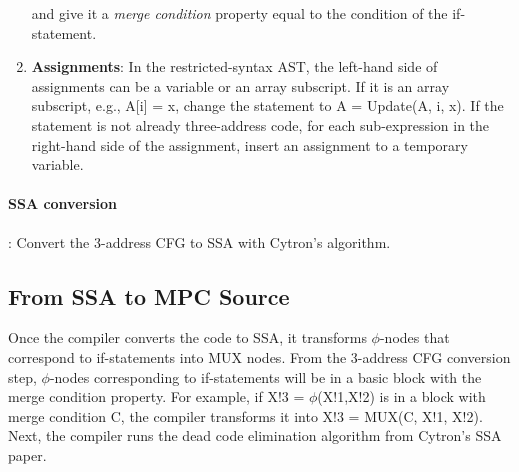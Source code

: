 \begin{enumerate}
                and give it a \emph{merge condition} property equal to the condition of the if-statement.
          \item
                \textbf{Assignments}:
                In the restricted-syntax AST,
                the left-hand side of assignments
                can be a variable or an array subscript.
                If it is an array subscript, e.g., {\sf A[i] = x},
                change the statement to {\sf A = Update(A, i, x)}.
                If the statement is not already three-address code,
                for each sub-expression in the right-hand side of the assignment,
                insert an assignment to a temporary variable.
        \end{enumerate}
        \paragraph{SSA conversion}:
        Convert the 3-address CFG to SSA with Cytron's algorithm.

\subsection{From SSA to MPC Source} %
\label{sec:ssa_to_MPC_Source}

Once the compiler converts the code to SSA,
it transforms $\phi$-nodes that correspond to if-statements into MUX nodes.
From the 3-address CFG conversion step,
$\phi$-nodes corresponding to if-statements will be in a basic block
with the merge condition property.
For example, if {\sf X!3 = $\phi$(X!1,X!2)} is in a block with merge condition {\sf C},
the compiler transforms it into {\sf X!3 = MUX(C, X!1, X!2)}.
Next, the compiler runs the dead code elimination algorithm from Cytron's SSA paper.

